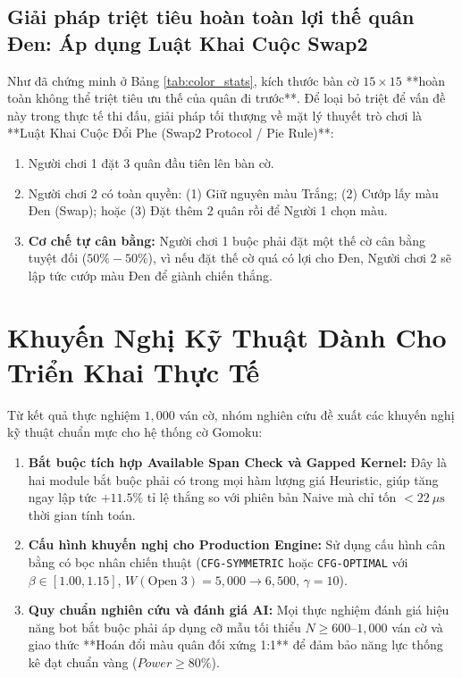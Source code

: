 \documentclass[11pt,a4paper]{article}
\begin{document}
\subsection{Giải pháp triệt tiêu hoàn toàn lợi thế quân Đen: Áp dụng Luật Khai Cuộc Swap2}
Như đã chứng minh ở Bảng \ref{tab:color_stats}, kích thước bàn cờ $15 \times 15$ **hoàn toàn không thể triệt tiêu ưu thế của quân đi trước**. Để loại bỏ triệt để vấn đề này trong thực tế thi đấu, giải pháp tối thượng về mặt lý thuyết trò chơi là **Luật Khai Cuộc Đổi Phe (Swap2 Protocol / Pie Rule)**:
\begin{enumerate}
    \item Người chơi 1 đặt 3 quân đầu tiên lên bàn cờ.
    \item Người chơi 2 có toàn quyền: (1) Giữ nguyên màu Trắng; (2) Cướp lấy màu Đen (Swap); hoặc (3) Đặt thêm 2 quân rồi để Người 1 chọn màu.
    \item \textbf{Cơ chế tự cân bằng:} Người chơi 1 buộc phải đặt một thế cờ cân bằng tuyệt đối ($50\% - 50\%$), vì nếu đặt thế cờ quá có lợi cho Đen, Người chơi 2 sẽ lập tức cướp màu Đen để giành chiến thắng.
\end{enumerate}

\section{Khuyến Nghị Kỹ Thuật Dành Cho Triển Khai Thực Tế}

Từ kết quả thực nghiệm $1{,}000$ ván cờ, nhóm nghiên cứu đề xuất các khuyến nghị kỹ thuật chuẩn mực cho hệ thống cờ Gomoku:

\begin{enumerate}
    \item \textbf{Bắt buộc tích hợp Available Span Check và Gapped Kernel:} Đây là hai module bắt buộc phải có trong mọi hàm lượng giá Heuristic, giúp tăng ngay lập tức $+11.5\%$ tỉ lệ thắng so với phiên bản Naive mà chỉ tốn $< 22\ \mu\text{s}$ thời gian tính toán.
    \item \textbf{Cấu hình khuyến nghị cho Production Engine:} Sử dụng cấu hình cân bằng có bọc nhân chiến thuật (\texttt{CFG-SYMMETRIC} hoặc \texttt{CFG-OPTIMAL} với $\beta \in [1.00, 1.15]$, $W(\text{Open 3}) = 5{,}000 \to 6{,}500$, $\gamma = 10$).
    \item \textbf{Quy chuẩn nghiên cứu và đánh giá AI:} Mọi thực nghiệm đánh giá hiệu năng bot bắt buộc phải áp dụng cỡ mẫu tối thiểu $N \ge 600\text{--}1{,}000$ ván cờ và giao thức **Hoán đổi màu quân đối xứng 1:1** để đảm bảo năng lực thống kê đạt chuẩn vàng ($Power \ge 80\%$).
\end{enumerate}
\end{document}
